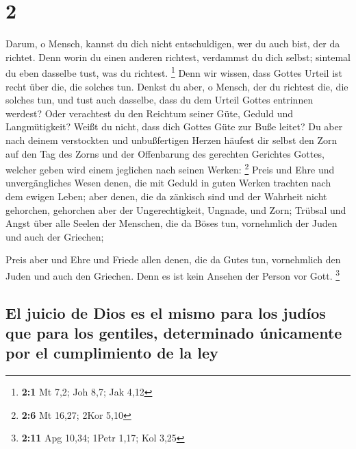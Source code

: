 \hypertarget{section-1}{%
\section{2}\label{section-1}}

 Darum, o Mensch, kannst du dich nicht entschuldigen, wer
du auch bist, der da richtet. Denn worin du einen anderen richtest,
verdammst du dich selbst; sintemal du eben dasselbe tust, was du
richtest. \footnote{\textbf{2:1} Mt 7,2; Joh 8,7; Jak 4,12}
 Denn wir wissen, dass Gottes Urteil ist recht über die,
die solches tun.  Denkst du aber, o Mensch, der du
richtest die, die solches tun, und tust auch dasselbe, dass du dem
Urteil Gottes entrinnen werdest?  Oder verachtest du den
Reichtum seiner Güte, Geduld und Langmütigkeit? Weißt du nicht, dass
dich Gottes Güte zur Buße leitet?  Du aber nach deinem
verstockten und unbußfertigen Herzen häufest dir selbst den Zorn auf den
Tag des Zorns und der Offenbarung des gerechten Gerichtes Gottes,
 welcher geben wird einem jeglichen nach seinen Werken:
\footnote{\textbf{2:6} Mt 16,27; 2Kor 5,10}  Preis und
Ehre und unvergängliches Wesen denen, die mit Geduld in guten Werken
trachten nach dem ewigen Leben;  aber denen, die da
zänkisch sind und der Wahrheit nicht gehorchen, gehorchen aber der
Ungerechtigkeit, Ungnade, und Zorn;  Trübsal und Angst
über alle Seelen der Menschen, die da Böses tun, vornehmlich der Juden
und auch der Griechen;

 Preis aber und Ehre und Friede allen denen, die da Gutes
tun, vornehmlich den Juden und auch den Griechen.  Denn
es ist kein Ansehen der Person vor Gott. \footnote{\textbf{2:11} Apg
  10,34; 1Petr 1,17; Kol 3,25}

\hypertarget{el-juicio-de-dios-es-el-mismo-para-los-juduxedos-que-para-los-gentiles-determinado-uxfanicamente-por-el-cumplimiento-de-la-ley}{%
\subsection{El juicio de Dios es el mismo para los judíos que para los
gentiles, determinado únicamente por el cumplimiento de la
ley}\label{el-juicio-de-dios-es-el-mismo-para-los-juduxedos-que-para-los-gentiles-determinado-uxfanicamente-por-el-cumplimiento-de-la-ley}}

